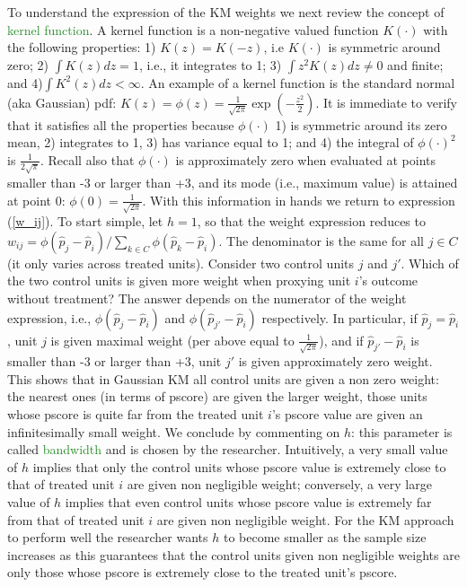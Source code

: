 \documentclass{article}
\begin{document}
{To understand the expression of the KM weights we next review the concept of \textcolor{ForestGreen}{kernel function}. A kernel function is a non-negative valued function $K(\cdot)$ with the following properties: 1) $K\left( z \right) = K\left( -z \right)$, i.e $K\left(\cdot \right) $ is symmetric around zero; 2) $\int K\left( z \right) dz =1$, i.e., it integrates to 1; 3) $\int z ^{2}K\left(z \right) dz \not=0$ and finite; and 4)$\int K^{2}\left( z \right) dz <\infty $. An example of a kernel function is the standard normal (aka Gaussian) pdf: $K\left( z\right) =\phi(z)=\frac{1}{\sqrt{2\pi }}\exp \left( -\frac{z^{2}}{2}\right)$. It is immediate to verify that it satisfies all the properties because $\phi(\cdot)$ 1) is symmetric around its zero mean, 2) integrates to 1, 3) has variance equal to 1; and 4) the integral of $\phi(\cdot)^2$ is $\frac{1}{2\sqrt{\pi}}$. Recall also that $\phi(\cdot)$ is approximately zero when evaluated at points smaller than -3 or larger than +3, and its mode (i.e., maximum value) is attained at point 0: $\phi(0)=\frac{1}{\sqrt{2\pi}}$. With this information in hands we return to expression (\ref{w_ij}). To start simple, let $h=1$, so that the weight expression reduces to $w_{ij}=\phi \left(\widehat{p}_{j}-\widehat{p}_{i}\right)/\sum_{k \in C}\phi \left( \widehat{p}_{k}-\widehat{p}_{i}\right)$. The denominator is the same for all $j \in C$ (it only varies across treated units). Consider two control units $j$ and $j'$. Which of the two control units is given more weight when proxying unit $i$'s outcome without treatment? The answer depends on the numerator of the weight expression, i.e.,  $\phi \left(\widehat{p}_{j}-\widehat{p}_{i}\right)$ and $\phi \left(\widehat{p}_{j'}-\widehat{p}_{i}\right)$ respectively. In particular, if $\widehat{p}_{j}=\widehat{p}_{i}$, unit $j$ is given maximal weight (per above equal to $\frac{1}{\sqrt{2\pi}}$), and if $\widehat{p}_{j'}-\widehat{p}_{i}$ is smaller than -3 or larger than +3, unit $j'$ is given approximately zero weight. This shows that in Gaussian KM all control units are given a non zero weight: the nearest ones (in terms of pscore) are given the larger weight, those units whose pscore is quite far from the treated unit $i$'s pscore value are given an infinitesimally small weight. We conclude by commenting on $h$: this parameter is called \textcolor{ForestGreen}{bandwidth} and is chosen by the researcher. Intuitively, a very small value of $h$ implies that only the control units whose pscore value is extremely close to that of treated unit $i$ are given non negligible weight; conversely, a very large value of $h$ implies that even control units whose pscore value is extremely far from that of treated unit $i$ are given non negligible weight. For the KM approach to perform well the researcher wants $h$ to become smaller as the sample size increases as this guarantees that the control units given non negligible weights are only those whose pscore is extremely close to the treated unit's pscore.
}
\end{document}
